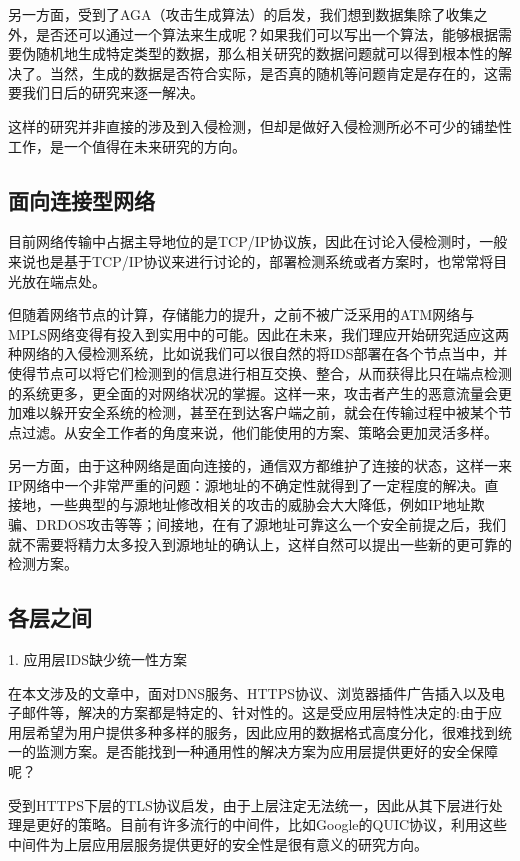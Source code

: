 \documentclass[12pt]{article} %
\begin{document}
另一方面，受到了AGA（攻击生成算法）的启发，我们想到数据集除了收集之外，是否还可以通过一个算法来生成呢？如果我们可以写出一个算法，能够根据需要伪随机地生成特定类型的数据，那么相关研究的数据问题就可以得到根本性的解决了。当然，生成的数据是否符合实际，是否真的随机等问题肯定是存在的，这需要我们日后的研究来逐一解决。

这样的研究并非直接的涉及到入侵检测，但却是做好入侵检测所必不可少的铺垫性工作，是一个值得在未来研究的方向。

\subsection{面向连接型网络}
\label{connect}

目前网络传输中占据主导地位的是TCP/IP协议族，因此在讨论入侵检测时，一般来说也是基于TCP/IP协议来进行讨论的，部署检测系统或者方案时，也常常将目光放在端点处。

但随着网络节点的计算，存储能力的提升，之前不被广泛采用的ATM网络与MPLS网络变得有投入到实用中的可能。因此在未来，我们理应开始研究适应这两种网络的入侵检测系统，比如说我们可以很自然的将IDS部署在各个节点当中，并使得节点可以将它们检测到的信息进行相互交换、整合，从而获得比只在端点检测的系统更多，更全面的对网络状况的掌握。这样一来，攻击者产生的恶意流量会更加难以躲开安全系统的检测，甚至在到达客户端之前，就会在传输过程中被某个节点过滤。从安全工作者的角度来说，他们能使用的方案、策略会更加灵活多样。

另一方面，由于这种网络是面向连接的，通信双方都维护了连接的状态，这样一来IP网络中一个非常严重的问题：源地址的不确定性就得到了一定程度的解决。直接地，一些典型的与源地址修改相关的攻击的威胁会大大降低，例如IP地址欺骗、DRDOS攻击等等；间接地，在有了源地址可靠这么一个安全前提之后，我们就不需要将精力太多投入到源地址的确认上，这样自然可以提出一些新的更可靠的检测方案。


\subsection{各层之间}
\label{layer}

1. 应用层IDS缺少统一性方案

在本文涉及的文章中，面对DNS服务、HTTPS协议、浏览器插件广告插入以及电子邮件等，解决的方案都是特定的、针对性的。这是受应用层特性决定的:由于应用层希望为用户提供多种多样的服务，因此应用的数据格式高度分化，很难找到统一的监测方案。是否能找到一种通用性的解决方案为应用层提供更好的安全保障呢？

受到HTTPS下层的TLS协议启发，由于上层注定无法统一，因此从其下层进行处理是更好的策略。目前有许多流行的中间件，比如Google的QUIC协议，利用这些中间件为上层应用层服务提供更好的安全性是很有意义的研究方向。
\end{document}
